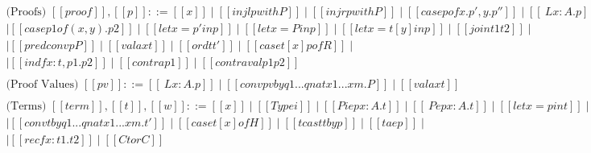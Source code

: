 \begin{center}
\begin{math}
\begin{array}{llllllllllllllll}
      \\
      \text{(Proofs) } [[proof]],[[p]] ::= [[x]] \mid [[injl p with P]] \mid [[injr p with P]] \mid [[case p of x . p' , y . p'']] \mid [[\ L x : A . p]] \mid [[p a]] \mid \\
      [[(a , p ) as P]] \mid [[case p1 of ( x , y ) . p2]] \mid [[let x = p' in p]] \mid [[let x = P in p]] \mid [[let x = t [ y ] in p]] \mid [[join t1 t2]] \mid \\ 
      [[conv p by q1 ... qn at x1 ... xm . P]] \mid [[predconv p P]] \mid [[valax t]] \mid [[ord t t']] \mid [[case t [ x ] p of R]] \mid\\
      [[tcase t [ x ] of abort -> p1 | ! -> p2]] \mid [[ind f x : t , p1 . p2]] \mid [[contra p1]] \mid [[contraval p1 p2]]\\
      \\
      \text{(Proof Values) } [[pv]] ::= [[\ L x : A . p]] \mid [[conv pv by q1 ... qn at x1 ... xm . P]] \mid [[valax t]]\\
      \\
      \text{(Terms) } [[term]],[[t]],[[w]] ::= [[x]] \mid [[Type i]] \mid [[Pi ep x : A . t]] \mid [[\ P ep x : A . t]] \mid [[let x = p in t]] \mid [[let x = P in t]] \mid \\
      [[let x = t [ y ] in t']] \mid [[conv t by q1 ... qn at x1 ... xm . t']] \mid [[case t [ x ] of H]] \mid [[tcast t by p]] \mid [[t a ep]] \mid \\
      [[abort t]] \mid [[rec f x : t1 . t2]] \mid [[Ctor C]]\\      
    \end{array}
  \end{math}
\end{center}
